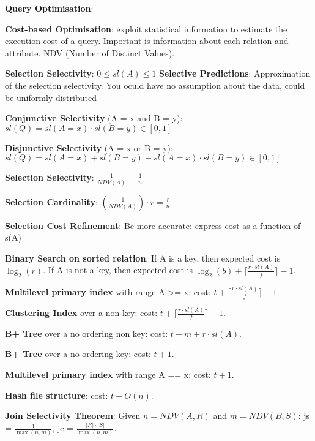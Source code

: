 \documentclass{article}
\begin{document}
\noindent \textbf{Query Optimisation}:

\noindent \textbf{Cost-based Optimisation}: exploit statistical information to estimate the execution cost of a query.
Important is information about each relation and attribute. NDV (Number of Distinct Values).

\noindent \textbf{Selection Selectivity}: $0 \leq sl(A) \leq 1$
\noindent \textbf{Selective Predictions}: Approximation of the selection selectivity. You oculd have no assumption about the data, 
could be uniformly distributed

\noindent \textbf{Conjunctive Selectivity} (A = x and B = y): $sl(Q) = sl(A = x) \cdot sl(B = y) \in [0, 1]$

\noindent \textbf{Disjunctive Selectivity} (A = x or B = y): $sl(Q) = sl(A = x) + sl(B = y) - sl(A = x) \cdot sl(B = y) \in [0, 1]$

\noindent \textbf{Selection Selectivity}: $\frac{1}{NDV(A)} = \frac{1}{n}$

\noindent \textbf{Selection Cardinality}: $\left(\frac{1}{NDV(A)}\right) \cdot r = \frac{r}{n}$

\noindent \textbf{Selection Cost Refinement}: Be more accurate: express cost as a function of {s(A)}

\noindent \textbf{Binary Search on sorted relation}: If A is a key, then expected cost is $\log_2(r)$.
If A is not a key, then expected cost is $\log_2(b) + \lceil \frac{r \cdot sl(A)}{f} \rceil - 1$.

\noindent \textbf{Multilevel primary index} with range A >= x: cost: $t + \lceil \frac{r \cdot sl(A)}{f} \rceil - 1$.

\noindent \textbf{Clustering Index} over a non key: cost: $t + \lceil \frac{r \cdot sl(A)}{f} \rceil - 1$.

\noindent \textbf{B+ Tree} over a no ordering non key: cost: $t + m + r \cdot sl(A)$.

\noindent \textbf{B+ Tree} over a no ordering key: cost: $t + 1$.

\noindent \textbf{Multilevel primary index} with range A == x: cost: $t + 1$.

\noindent \textbf{Hash file structure}: cost: $t + O(n)$.

\noindent \textbf{Join Selectivity Theorem}: Given $n = NDV(A, R)$ and $m = NDV(B, S)$: js = $\frac{1}{\max(n, m)}$, jc = $\frac{|R| \cdot |S|}{\max(n, m)}$.
\end{document}
